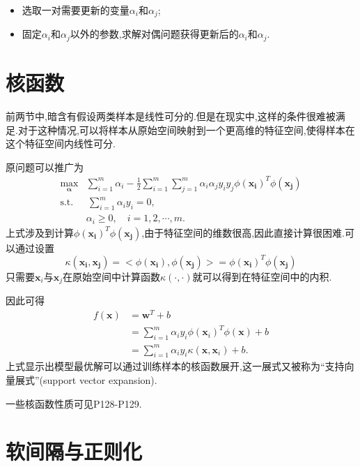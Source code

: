 \begin{itemize}
\item 选取一对需要更新的变量$\alpha_i$和$\alpha_j$;
\item 固定$\alpha_i$和$\alpha_j$以外的参数,求解对偶问题获得更新后的$\alpha_i$和$\alpha_j$.
\end{itemize}

\section{核函数}

前两节中,暗含有假设两类样本是线性可分的.但是在现实中,这样的条件很难被满足.对于这种情况,可以将样本从原始空间映射到一个更高维的特征空间,使得样本在这个特征空间内线性可分.

原问题可以推广为
\begin{equation}\begin{split}
\max_{\bm\alpha}&\sum_{i=1}^m\alpha_i-\frac{1}{2}\sum_{i=1}^m\sum_{j=1}^m\alpha_i\alpha_jy_iy_j\phi(\bm{x_i})^T\phi(\bm{x_j})\\
\text{s.t.}&\,\sum_{i=1}^m\alpha_iy_i=0,\\
&\alpha_i\ge 0,\quad i=1,2,\cdots,m.
\end{split}\end{equation}
上式涉及到计算$\phi(\bm{x_i})^T\phi(\bm{x_j})$,由于特征空间的维数很高,因此直接计算很困难.可以通过设置
\begin{equation}\kappa(\bm{x_i,x_j})=<\phi(\bm{x_i}),\phi(\bm{x_j})>=\phi(\bm{x_i})^T\phi(\bm{x_j})\end{equation}
只需要$\bm x_i$与$\bm x_j$在原始空间中计算函数$\kappa(\cdot,\cdot)$就可以得到在特征空间中的内积.

因此可得
\begin{equation}\begin{split}
f(\bm x)&=\bm w^T+b\\
&=\sum_{i=1}^m\alpha_iy_i\phi(\bm x_i)^T\phi(\bm x)+b\\
&=\sum_{i=1}^m\alpha_iy_i\kappa(\bm x,\bm x_i)+b.
\end{split}\end{equation}
上式显示出模型最优解可以通过训练样本的核函数展开,这一展式又被称为``支持向量展式''(support vector expansion).

一些核函数性质可见P128-P129.

\section{软间隔与正则化}

